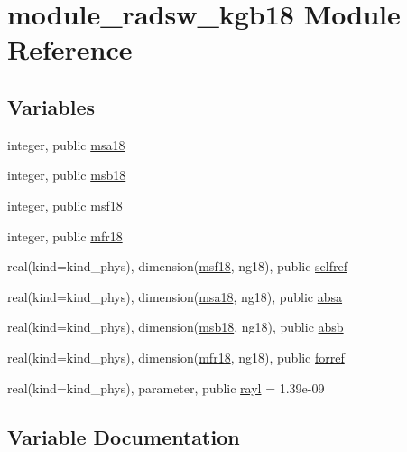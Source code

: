 \hypertarget{namespacemodule__radsw__kgb18}{}\section{module\+\_\+radsw\+\_\+kgb18 Module Reference}
\label{namespacemodule__radsw__kgb18}
\subsection*{Variables}
\begin{DoxyCompactItemize}
\item 
integer, public \hyperlink{namespacemodule__radsw__kgb18_a48213008c9ed8f94aaad4ef327d38583}{msa18}
\item 
integer, public \hyperlink{group__module__radsw__main_gad2e52d9beb90328236a351926d1a3432}{msb18}
\item 
integer, public \hyperlink{group__module__radsw__main_ga1d74002f71710887e45df89d3897a10a}{msf18}
\item 
integer, public \hyperlink{group__module__radsw__main_ga9fa8140413e7ec769baea4f207e58393}{mfr18}
\item 
real(kind=kind\+\_\+phys), dimension(\hyperlink{group__module__radsw__main_ga1d74002f71710887e45df89d3897a10a}{msf18}, ng18), public \hyperlink{group__module__radsw__main_ga488f807878d909b8f69457b0d7d8ac6a}{selfref}
\item 
real(kind=kind\+\_\+phys), dimension(\hyperlink{namespacemodule__radsw__kgb18_a48213008c9ed8f94aaad4ef327d38583}{msa18}, ng18), public \hyperlink{group__module__radsw__main_ga8a7787776bd057b1815e92a5f58b9cac}{absa}
\item 
real(kind=kind\+\_\+phys), dimension(\hyperlink{group__module__radsw__main_gad2e52d9beb90328236a351926d1a3432}{msb18}, ng18), public \hyperlink{group__module__radsw__main_ga858680db0ee5e9a599639844a91f8f06}{absb}
\item 
real(kind=kind\+\_\+phys), dimension(\hyperlink{group__module__radsw__main_ga9fa8140413e7ec769baea4f207e58393}{mfr18}, ng18), public \hyperlink{group__module__radsw__main_ga0efc293c91de3d17b29ed713ff09d7a9}{forref}
\item 
real(kind=kind\+\_\+phys), parameter, public \hyperlink{group__module__radsw__main_ga9cd3f07e259e4982c7ef2889fee6cccb}{rayl} = 1.\+39e-\/09
\end{DoxyCompactItemize}


\subsection{Variable Documentation}
